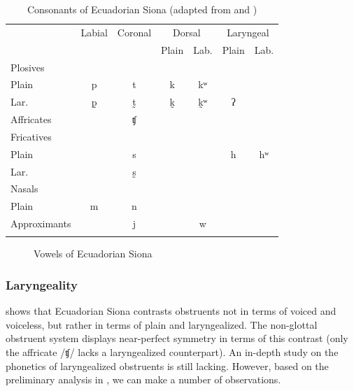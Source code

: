 \documentclass[output=paper]{langscibook}
\begin{document}
\begin{table}
\begin{tabular}{lcccccc}
    \lsptoprule
&	Labial	&	Coronal	&	\multicolumn{2}{c}{Dorsal}				& \multicolumn{2}{c}{Laryngeal}\\\cmidrule(lr){4-5}\cmidrule(lr){6-7}
&			&			&	Plain		&	Lab.				&		Plain		&	Lab.	\\ \midrule
Plosives & \\
\quad Plain			&	p		&	t		&	k		&	kʷ		&			\\
\quad Lar.	&	p̰	&	t̰	&	k̰	&	k̰ʷ&	ʔ	&	\\
Affricates	&			&	ʧ		&			&						&			\\
Fricatives	& \\
\quad Plain			&			&	s		&			&						&	h	&  hʷ	\\
\quad Lar.	&			&	s̰	&			&						&			\\
Nasals	& \\
\quad Plain			&	m		&	n		&			&						&			\\
Approximants			&			&	j		&			&	w					&			\\
\lspbottomrule
\end{tabular}
\caption{Consonants of Ecuadorian Siona (adapted from \citealt[87]{Bruil:2014} and  \citealt{BruilStewart:2022})}\label{tab-cons}
\end{table}

\begin{figure}[ht]
	\centering
	{\large
	\begin{vowel}[three]
	\end{vowel}}\caption{Vowels of Ecuadorian Siona}\label{tab-vow}
\end{figure}


\subsubsection{Laryngeality}\label{sec-laryng}
 shows that Ecuadorian Siona contrasts obstruents not in terms of voiced and voiceless, but rather in terms of plain and laryngealized. The non-glottal obstruent system displays near-perfect symmetry in terms of this contrast (only the affricate \mbox{/ʧ/} lacks a laryngealized counterpart). An in-depth study on the phonetics of laryngealized obstruents is still lacking. However, based on the preliminary analysis in \citet{Bruil:2014}, we can make a number of observations.
\end{document}
